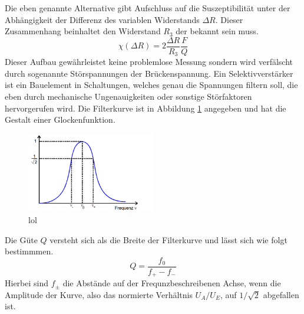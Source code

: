Die eben genannte Alternative gibt Aufschluss auf die Suszeptibilität unter der Abhängigkeit der Differenz des variablen Widerstands %
$\Delta R$. Dieser Zusammenhang beinhaltet den Widerstand $R_3$ der bekannt sein muss.
\begin{equation}
    \label{eqn:werdasliestistOMEGAundGIGAdummXD}
    \chi(\Delta R) = 2 \frac{\Delta R}{R_3}\frac{F}{Q}
\end{equation}
Dieser Aufbau gewährleistet keine problemlose Messung sondern wird verfälscht durch sogenannte Störspannungen der Brückenspannung.
Ein Selektivverstärker ist ein Bauelement in Schaltungen, welches genau die Spannungen filtern soll, die eben durch mechanische Ungenauigkeiten 
oder sonstige Störfaktoren hervorgerufen wird. Die Filterkurve ist in Abbildung \ref{fig:glocke} angegeben und hat die Gestalt einer Glockenfunktion.
\begin{figure}
    \centering
    \includegraphics[width=0.5\textwidth]{bilder/glocke.png}
    \caption{lol}
    \label{fig:glocke}
\end{figure}
Die Güte $Q$ versteht sich als die Breite der Filterkurve und lässt sich wie folgt bestimmmen.
\begin{equation}
    \label{eq:achduliebeGüte}    
    Q= \frac{f_0}{f_+ - f_-}
\end{equation}
Hierbei sind $f_{\pm}$ die Abstände auf der Frequnzbeschreibenen Achse, wenn die Amplitude der Kurve, also das normierte Verhältnis $U_A/U_E$,
auf $1/\sqrt{2}$ abgefallen ist.